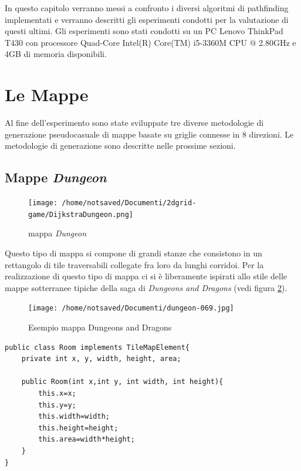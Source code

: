 \documentclass[11pt]{book}
\begin{document}
\par{In questo capitolo verranno messi a confronto i diversi algoritmi di pathfinding implementati e verranno descritti gli esperimenti condotti per la valutazione di questi ultimi. Gli esperimenti sono stati condotti su un PC Lenovo ThinkPad T430 con processore Quad-Core Intel(R) Core(TM) i5-3360M CPU @ 2.80GHz e 4GB di memoria disponibili.
}

\section{Le Mappe}

Al fine dell'esperimento sono state sviluppate tre diverse metodologie di generazione pseudocasuale di mappe basate su griglie connesse in 8 direzioni. Le metodologie di generazione sono descritte nelle prossime sezioni.
\subsection{Mappe \emph{Dungeon}}
\begin{figure}[H]
\centering
\texttt{[image: /home/notsaved/Documenti/2dgrid-game/DijkstraDungeon.png]}
\caption{mappa \emph{Dungeon}}
\label{img1}
\end{figure}
\par{Questo tipo di mappa si compone di grandi stanze che consistono in un rettangolo di tile traversabili collegate fra loro da lunghi corridoi. Per la realizzazione di questo tipo di mappa ci si \`e liberamente ispirati allo stile delle mappe sotterranee tipiche della saga di \emph{Dungeons and Dragons} (vedi figura \ref{img111}).}
\begin{figure}[H]
\centering
\texttt{[image: /home/notsaved/Documenti/dungeon-069.jpg]}
\caption{Esempio mappa Dungeons and Dragons}
\label{img111}
\end{figure}
\iffalse
\par {
\begin{minipage}{\linewidth}
\begin{lstlisting}
public class Room implements TileMapElement{
	private int x, y, width, height, area;

	public Room(int x,int y, int width, int height){
		this.x=x;
		this.y=y;
		this.width=width;
		this.height=height;
		this.area=width*height;
	}
}

\end{lstlisting}
\end{minipage}
}
\end{document}

